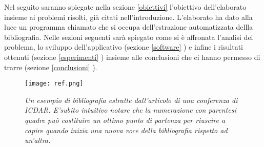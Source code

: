 Nel seguito saranno spiegate nella sezione \ref{obiettivi} l'obiettivo dell'elaborato insieme ai problemi risolti, già citati nell'introduzione. L'elaborato ha dato alla luce un programma chiamato \textit{} che si occupa dell'estrazione automatizzata dellla bibliografia. Nelle sezioni seguenti sarà spiegato come si è affronata l'analisi del problema, lo sviluppo dell'applicativo (sezione \ref{software} ) e infine i risultati ottenuti (sezione \ref{esperimenti} ) insieme alle conclusioni che ci hanno permesso di trarre (sezione \ref{conclusioni} ).


\begin{figure}[htb]
\begin{center}
\texttt{[image: ref.png]}
\end{center}
\caption[Un esempio di bibliografia]{\textit{Un esempio di bibliografia estratte dall'articolo di una conferenza di ICDAR. E'subito intuitivo notare che la numerazione con parentesi quadre può costituire un ottimo punto di partenza per riuscire a capire quando inizia una nuova voce della bibliografia rispetto ad un'altra.}}
\label{fig:ref-examples}
\end{figure}



